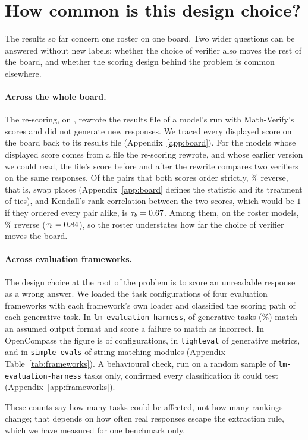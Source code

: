 \section{How common is this design choice?}
\label{sec:generality}

The results so far concern one roster on one board. Two wider questions can be answered without
new labels: whether the choice of verifier also moves the rest of the board, and whether the
scoring design behind the problem is common elsewhere.

\paragraph{Across the whole board.}
The re-scoring, on \BoardRegradeDate{}, rewrote the results file of a model's run with Math-Verify's
scores and did not generate new responses. We traced every displayed score on the board back to its
results file (Appendix~\ref{app:board}). For the \BoardShiftModels{} models whose displayed score
comes from a file the re-scoring rewrote, and whose earlier version we could read, the file's score
before and after the rewrite compares two verifiers on the same responses. Of the pairs that both
scores order strictly, \BoardShiftDiscordantPct\% reverse, that is, swap places
(Appendix~\ref{app:board} defines the statistic and its treatment of ties), and Kendall's rank
correlation between the two scores, which would be $1$ if they ordered every pair alike, is
$\tau_b = 0.67$. Among them, on the \RosterShiftModels{} roster models,
\RosterShiftDiscordantPct\% reverse ($\tau_b = 0.84$), so the roster understates how far
the choice of verifier moves the board.

\paragraph{Across evaluation frameworks.}
The design choice at the root of the problem is to score an unreadable response as a wrong
answer. We loaded the task configurations of four evaluation frameworks
\citep{biderman2024lessons, opencompass2026, fourrier2024lighteval, openai2024simpleevals} with
each framework's own loader and classified the scoring path of each generative task. In
\texttt{lm-evaluation-harness}, \LmEvalCoerce{} of \LmEvalGenerative{} generative tasks
(\LmEvalCoercePct\%) match an assumed output format and score a failure to match as incorrect. In OpenCompass the figure is
\OpenCompassCoerce{} of \OpenCompassGenerative{} configurations, in \texttt{lighteval}
\LightevalCoerce{} of \LightevalGenerative{} generative metrics, and in \texttt{simple-evals}
\SimpleEvalsCoerce{} of \SimpleEvalsStringMatch{} string-matching modules (Appendix
Table~\ref{tab:frameworks}). A behavioural check, run on a random sample of
\texttt{lm-evaluation-harness} tasks only, confirmed every classification it could test
(Appendix~\ref{app:frameworks}).

These counts say how many tasks could be affected, not how many rankings change; that depends on
how often real responses escape the extraction rule, which we have measured for one benchmark only.
